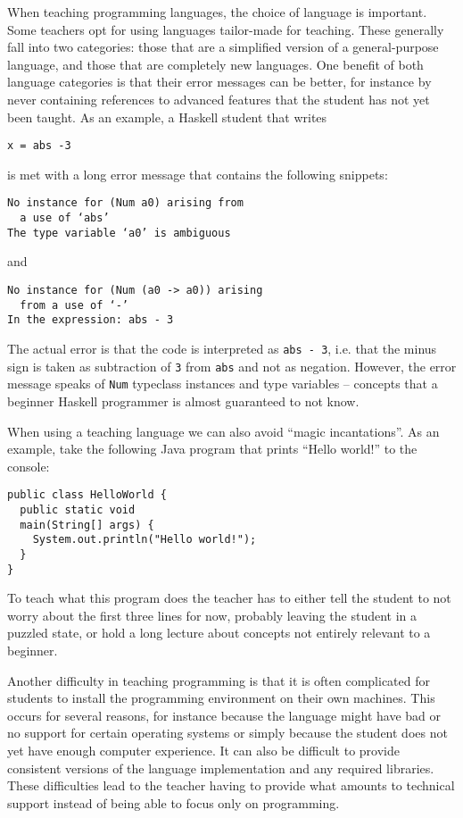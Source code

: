 When teaching programming languages, the choice of language is important.  Some
teachers opt for using languages tailor-made for teaching. These generally fall
into two categories: those that are a simplified version of a general-purpose
language, and those that are completely new languages. One benefit of both
language categories is that their error messages can be better, for instance by
never containing references to advanced features that the student has not yet
been taught. As an example, a Haskell student that writes
\begin{verbatim}
x = abs -3
\end{verbatim}
is met with a long error message that contains the following snippets:
\begin{verbatim}
No instance for (Num a0) arising from
  a use of ‘abs’
The type variable ‘a0’ is ambiguous
\end{verbatim}
and
\begin{verbatim}
No instance for (Num (a0 -> a0)) arising
  from a use of ‘-’
In the expression: abs - 3
\end{verbatim}
The actual error is that the code is interpreted as \texttt{abs - 3}, i.e.
that the minus sign is taken as subtraction of \texttt{3} from \texttt{abs} and
not as negation.  However, the error message speaks of \texttt{Num} typeclass
instances and type variables -- concepts that a beginner Haskell programmer is
almost guaranteed to not know.

When using a teaching language we can also avoid ``magic incantations''. As an
example, take the following Java program that prints ``Hello world!'' to the
console:
\begin{verbatim}
public class HelloWorld {
  public static void
  main(String[] args) {
    System.out.println("Hello world!");
  }
}
\end{verbatim}
To teach what this program does the teacher has to either tell the student to
not worry about the first three lines for now, probably leaving the student in
a puzzled state, or hold a long lecture about concepts not entirely relevant to
a beginner.

Another difficulty in teaching programming is that it is often complicated for
students to install the programming environment on their own machines. This
occurs for several reasons, for instance because the language might have bad or
no support for certain operating systems or simply because the student does not
yet have enough computer experience. It can also be difficult to provide
consistent versions of the language implementation and any required libraries.
These difficulties lead to the teacher having to provide what amounts to
technical support instead of being able to focus only on programming.

